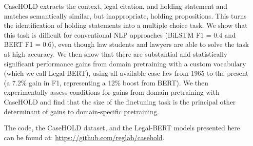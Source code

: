 \documentclass[sigconf]{acmart}
\begin{document}
CaseHOLD extracts the context, legal citation, and holding statement and matches semantically similar, but inappropriate, holding propositions. This turns the identification of holding statements into a multiple choice task.  We show that this task is difficult for conventional NLP approaches (BiLSTM F1 = 0.4 and BERT F1 = 0.6), even though law students and lawyers are able to solve the task at high accuracy. We then show that there are substantial and statistically significant performance gains from domain pretraining with a custom vocabulary (which we call Legal-BERT), using all available case law from 1965 to the present (a 7.2\% gain in F1, representing a 12\% boost from BERT). We then experimentally assess conditions for gains from domain pretraining with CaseHOLD and find that the size of the finetuning task is the principal other determinant of gains to domain-specific pretraining.

The code, the CaseHOLD dataset, and the Legal-BERT models presented here can be found at: \url{https://github.com/reglab/casehold}.
\end{document}
